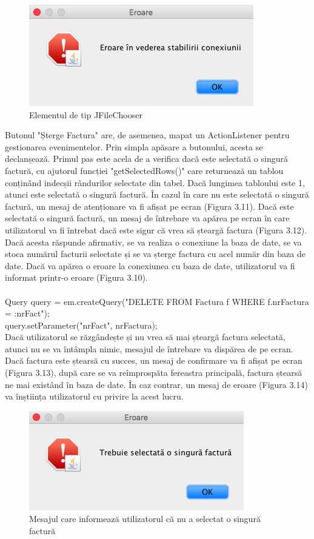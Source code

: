 \documentclass[12pt]{book}
\begin{document}
\begin{figure}[!ht]
	\centering
	\includegraphics{EroareConexiune}
	\caption{Elementul de tip JFileChooser}
\end{figure}

Butonul "Șterge Factura" are, de asemenea, mapat un ActionListener pentru gestionarea evenimentelor. Prin simpla apăsare a butonului, acesta se declanșează. Primul pas este acela de a verifica dacă este selectată o singură factură, cu ajutorul funcției "getSelectedRows()" care returnează un tablou conținând indecșii rândurilor selectate din tabel. Dacă lungimea tabloului este 1, atunci este selectată o singură factură. În cazul în care nu este selectată o singură factură, un mesaj de atenționare va fi afișat pe ecran (Figura 3.11). Dacă este selectată o singură factură, un mesaj de întrebare va apărea pe ecran în care utilizatorul va fi întrebat dacă este sigur că vrea să șteargă factura (Figura 3.12). Dacă acesta răspunde afirmativ, se va realiza o conexiune la baza de date, se va stoca numărul facturii selectate și se va șterge factura cu acel număr din baza de date. Dacă va apărea o eroare la conexiunea cu baza de date, utilizatorul va fi informat printr-o eroare (Figura 3.10). \\\\
Query query = em.createQuery("DELETE FROM Factura f WHERE f.nrFactura = :nrFact");\\
query.setParameter("nrFact", nrFactura);\\

Dacă utilizatorul se răzgândește și nu vrea să mai șteargă factura selectată, atunci nu se va întâmpla nimic, mesajul de întrebare va dispărea de pe ecran. Dacă factura este ștearsă cu succes, un mesaj de confirmare va fi afișat pe ecran (Figura 3.13), după care se va reîmprospăta fereastra principală, factura ștearsă ne mai existând în baza de date. În caz contrar, un mesaj de eroare (Figura 3.14) va înștiința utilizatorul cu privire la acest lucru.

\begin{figure}[!ht]
	\centering
	\includegraphics{TrebuieSelectata1Factura}
	\caption{Mesajul care informează utilizatorul că nu a selectat o singură factură}
\end{figure}
\end{document}
